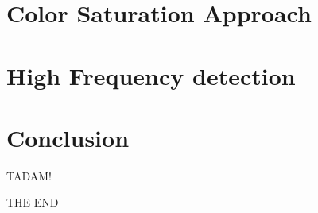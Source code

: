 \documentclass[letterpaper, 10 pt, conference]{ieeeconf} %
\begin{document}

\section{Color Saturation Approach}


\section{High Frequency detection}


\section{Conclusion}
TADAM! 

THE END


\addtolength{\textheight}{-12cm} %


\end{document}
